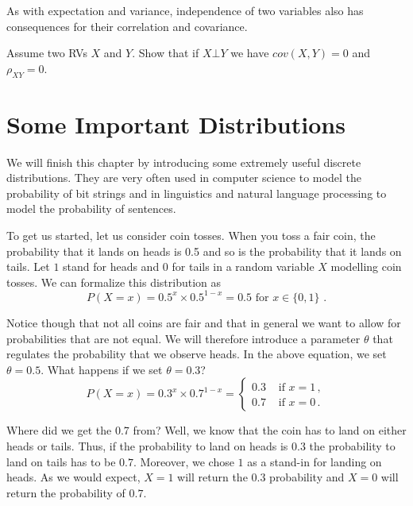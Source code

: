 As with expectation and variance, independence of two variables also has consequences for their correlation and covariance.
\begin{Exercise}
Assume two RVs $ X $ and $ Y $. Show that if $ X \bot Y $ we have $ cov(X,Y) = 0 $ and $ \rho_{XY} = 0 $.
\end{Exercise}

\section{Some Important Distributions} \label{sec:importantdistributions}

We will finish this chapter by introducing some extremely useful discrete distributions. They are very often used in
computer science to model the probability of bit strings and in linguistics and natural language processing to model
the probability of sentences. 

To get us started, let us consider coin tosses. When you toss a fair coin, the probability that it lands on heads is 0.5 and
so is the probability that it lands on tails. Let $ 1 $ stand for heads and $ 0 $ for tails in a random variable $ X $ 
modelling coin tosses. We can formalize this distribution as
\begin{equation*}
P(X=x) = 0.5^{x}\times 0.5^{1-x} = 0.5 \mbox{ for $x \in \{0,1\}$ .}
\end{equation*}

Notice though that not all coins are fair and that in general we want to allow for probabilities that are not equal. 
We will therefore introduce a parameter $ \theta $ that regulates the probability that we observe heads. In the
above equation, we set $ \theta = 0.5 $. What happens if we set $ \theta = 0.3 $?
\begin{equation}
P(X=x) = 0.3^{x} \times 0.7^{1-x} = 
\begin{cases}
0.3 & \mbox{ if $x=1$} \, , \\
0.7 & \mbox{ if $x=0$} \, .
\end{cases}
\end{equation}

Where did we get the 0.7 from? Well, we know that the coin has to land on either heads or tails. Thus, if the probability
to land on heads is $ 0.3 $ the probability to land on tails has to be $ 0.7 $. Moreover, we chose $ 1 $ as a stand-in for
landing on heads. As we would expect, $ X = 1 $ will return the $ 0.3 $ probability and $ X = 0 $ will return the probability of $ 0.7 $.

